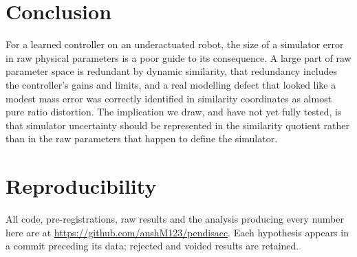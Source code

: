 \documentclass[conference]{IEEEtran}
\newcommand{\repo}{\url{https://github.com/anshM123/pendisacc}}
\begin{document}
\section{Conclusion}

For a learned controller on an underactuated robot, the size of a simulator
error in raw physical parameters is a poor guide to its consequence. A large
part of raw parameter space is redundant by dynamic similarity, that
redundancy includes the controller's gains and limits, and a real modelling
defect that looked like a modest mass error was correctly identified in
similarity coordinates as almost pure ratio distortion. The implication we
draw, and have not yet fully tested, is that simulator uncertainty should be
represented in the similarity quotient rather than in the raw parameters that
happen to define the simulator.

\section*{Reproducibility}
All code, pre-registrations, raw results and the analysis producing every
number here are at \repo. Each hypothesis appears in a commit preceding its
data; rejected and voided results are retained.
\end{document}
